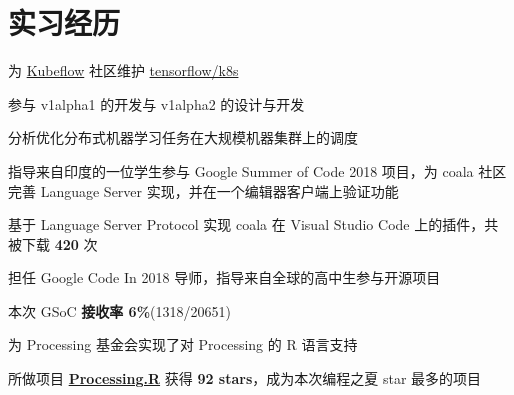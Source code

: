 \documentclass[]{deedy-resume-openfont}
\begin{document}
\begin{minipage}[t]{0.68\textwidth}


\section{实习经历}

\sectionsep
{}
\vspace{\topsep}
\begin{tightemize}
    \item 为 \href{https://github.com/kubeflow/kubeflow}{Kubeflow} 社区维护 \href{https://github.com/tensorflow/k8s}{tensorflow/k8s}
    \item 参与 v1alpha1 的开发与 v1alpha2 的设计与开发
    \item 分析优化分布式机器学习任务在大规模机器集群上的调度
\end{tightemize}
\sectionsep

\sectionsep
{}
\vspace{\topsep}
\begin{tightemize}
    \item 指导来自印度的一位学生参与 Google Summer of Code 2018 项目，为 coala 社区完善 Language Server 实现，并在一个编辑器客户端上验证功能
\end{tightemize}
\sectionsep

\sectionsep
{}
\vspace{\topsep}
\begin{tightemize}
    \item 基于 Language Server Protocol 实现 coala 在 Visual Studio Code 上的插件，共被下载 \textbf{420} 次
    \item 担任 Google Code In 2018 导师，指导来自全球的高中生参与开源项目
\end{tightemize}
\sectionsep

\sectionsep
{}
\vspace{\topsep}
\begin{tightemize}
    \item 本次 GSoC \textbf{接收率 6\%}(1318/20651)
    \item 为 Processing 基金会实现了对 Processing 的 R 语言支持
    \item 所做项目 \href{https://github.com/gaocegege/Processing.R}{\bf Processing.R} 获得 \textbf{92 stars}，成为本次编程之夏 star 最多的项目
\end{tightemize}
\sectionsep


\end{minipage}
\end{document}
